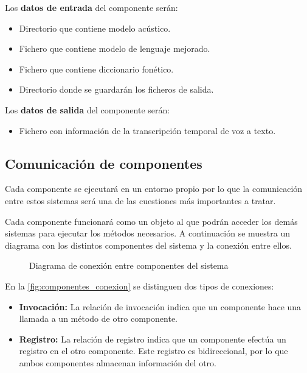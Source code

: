 \documentclass[../main.tex]{subfiles}
\begin{document}
Los \textbf{datos de entrada} del componente serán:
\begin{itemize}
    \item Directorio que contiene modelo acústico.
    \item Fichero que contiene modelo de lenguaje mejorado.
    \item Fichero que contiene diccionario fonético.
    \item Directorio donde se guardarán los ficheros de salida.
\end{itemize}

Los \textbf{datos de salida} del componente serán:
\begin{itemize}
    \item Fichero con información de la transcripción temporal de voz a texto.
\end{itemize}

\subsection{Comunicación de componentes}\label{subsec:comunicacion_componentes}
Cada componente se ejecutará en un entorno propio por lo que la comunicación entre estos sistemas será una de las cuestiones más importantes a tratar.

Cada componente funcionará como un objeto al que podrán acceder los demás sistemas para ejecutar los métodos necesarios. A continuación se muestra un diagrama con los distintos componentes del sistema y la conexión entre ellos.

\begin{figure}[H]
    \centering
    
    \caption{Diagrama de conexión entre componentes del sistema}
    \label{fig:componentes_conexion}
\end{figure}

En la \autoref{fig:componentes_conexion} se distinguen dos tipos de conexiones:
\begin{itemize}
    \item \textbf{Invocación:} La relación de invocación indica que un componente hace una llamada a un método de otro componente.
    \item \textbf{Registro:} La relación de registro indica que un componente efectúa un registro en el otro componente. Este registro es bidireccional, por lo que ambos componentes almacenan información del otro.
\end{itemize}
\end{document}
